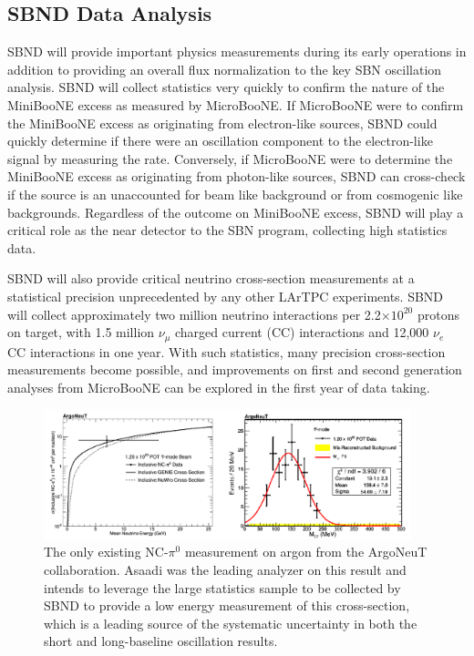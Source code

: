 \subsection{SBND Data Analysis}\label{sec:SBNDDataAnalysis}
SBND will provide important physics measurements during its early operations in addition to providing an overall flux normalization to the key SBN oscillation analysis. SBND will collect statistics very quickly to confirm the nature of the MiniBooNE excess as measured by MicroBooNE. If MicroBooNE were to confirm the MiniBooNE excess as originating from electron-like sources, SBND could quickly determine if there were an oscillation component to the electron-like signal by measuring the rate.  Conversely, if MicroBooNE were to determine the MiniBooNE excess as originating from photon-like sources, SBND can cross-check if the source is an unaccounted for beam like background or from cosmogenic like backgrounds. Regardless of the outcome on MiniBooNE excess, SBND will play a critical role as the near detector to the SBN program, collecting high statistics data.

SBND will also provide critical neutrino cross-section measurements at a statistical precision unprecedented by any other LArTPC experiments.  SBND will collect approximately two million neutrino interactions per 2.2$\times 10^{20}$ protons on target, with 1.5 million $\nu_{\mu}$ charged current (CC) interactions and 12,000 $\nu_{e}$ CC interactions in one year. With such statistics, many precision cross-section measurements become possible, and improvements on first and second generation analyses from MicroBooNE can be explored in the first year of data taking.

\begin{figure}[htb]
\centering
\includegraphics[width=0.95\textwidth]{images/ArgoNeuTPizeroResult.png}
\caption[]{The only existing NC-$\pi^0$ measurement on argon from the ArgoNeuT collaboration. Asaadi was the leading analyzer on this result and intends to leverage the large statistics sample to be collected by SBND to provide a low energy measurement of this cross-section, which is a leading source of the systematic uncertainty in both the short and long-baseline oscillation results.}
\label{fig:argoneutpizero}
\end{figure} 

